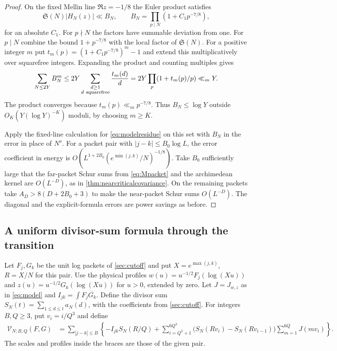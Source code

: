 \documentclass[11pt,a4paper]{article}
\numberwithin{equation}{section}
\newcommand{\SSS}{\mathfrak S}
\begin{document}
\begin{proof}
On the fixed Mellin line $\Re z=-1/8$ the Euler product
satisfies
\[
 \SSS(N)|H_N(z)|\ll
 B_N,\qquad B_N=\prod_{p\mid N}(1+C_1p^{-7/8}),
\]
for an absolute $C_1$. For $p\nmid N$ the factors have
summable deviation from one. For $p\mid N$ combine the
bound $1+p^{-7/8}$ with the local factor of $\SSS(N)$.
For a positive integer $m$ put
$t_m(p)=(1+C_1p^{-7/8})^m-1$ and extend this
multiplicatively over squarefree integers. Expanding
the product and counting multiples gives
\[
 \sum_{N\le2Y}B_N^m
 \le 2Y\sum_{\substack{d\ge1\\ d\ {\rm squarefree}}}
                 \frac{t_m(d)}{d}
 =2Y\prod_p(1+t_m(p)/p)\ll_m Y.
\]
The product converges because $t_m(p)\ll_m p^{-7/8}$.
Thus $B_N\le\log Y$ outside
$O_K(Y(\log Y)^{-K})$ moduli, by choosing $m\ge K$.

Apply the fixed-line calculation for \cref{eq:modelresidue}
on this set with $B_N$ in the error in place of $N^\nu$.
For a packet pair with $|j-k|\le B_0\log L$,
the error coefficient in energy is
$O(L^{1+2B_0}(e^{\min(j,k)}/N)^{-1/8})$.
Take $B_0$ sufficiently large that the far-packet
Schur sums from \cref{eq:Mpacket} and the archimedean
kernel are $O(L^{-D})$, as in
\cref{thm:nearcriticalcovariance}. On the remaining
packets take $A_D>8(D+2B_0+3)$ to make the near-packet
Schur sums $O(L^{-D})$. The diagonal and the
explicit-formula errors are power savings as before.
\end{proof}

\subsection{A uniform divisor-sum formula through the transition}

Let $F_j,G_k$ be the unit log packets of \cref{sec:cutoff} and
put $X=e^{\max(j,k)}$, $R=X/N$ for this pair. Use the physical
profiles $w(u)=u^{-1/2}F_j(\log(Xu))$ and
$z(u)=u^{-1/2}G_k(\log(Xu))$ for $u>0$, extended by zero.
Let $J=J_{w,z}$ as in \cref{eq:model} and $I_{jk}=\int F_j\overline{G_k}$.
Define the divisor sum $S_N(t)=\sum_{1\le d\le t}a_N(d)$, with the
coefficients from \cref{sec:cutoff}. For integers $B,Q\ge3$, put
$v_i=i/Q^3$ and define
\begin{align}
 \mathcal V_{N;B,Q}(F,G)
   &=\sum_{|j-k|\le B}\left\{-I_{jk}S_N(R/Q)
   +\sum_{i=Q^2+1}^{6Q^3}
     \bigl(S_N(Rv_i)-S_N(Rv_{i-1})\bigr)
     \sum_{m=1}^{6Q}J(mv_i)\right\}.
 \label{eq:divisorgrid}
\end{align}
The scales and profiles inside the braces are those of the given pair.
\end{document}
